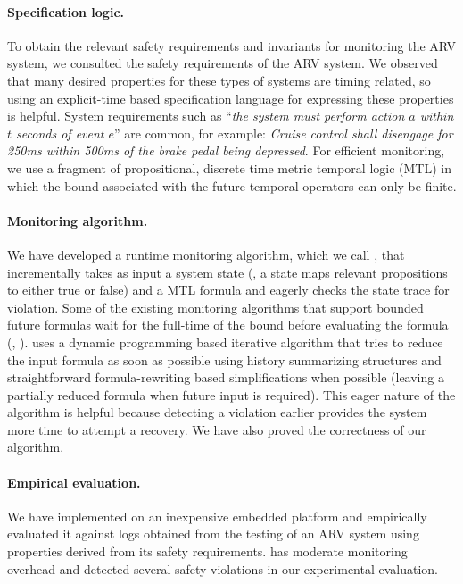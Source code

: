 \paragraph{Specification logic.}
To obtain the relevant safety requirements and invariants for monitoring the ARV system, we consulted the safety requirements of the ARV system. 
We observed that many desired properties for these types of systems are timing related, so using an explicit-time based specification language for expressing these properties is helpful. 
System requirements such as ``\emph{the system must perform action $a$ within $t$ seconds of event $e$}'' are common, 
%
for example: \emph{Cruise control shall disengage for 250ms within 500ms of the brake pedal being depressed}.
%
For efficient monitoring, we use a fragment of propositional, discrete time metric temporal logic (MTL)\cite{Koymans1990} in which the bound associated with the future temporal operators can only be finite. %

\paragraph{Monitoring algorithm.}
We have developed a runtime monitoring algorithm, which we call \monitor, that incrementally takes as input a system state (\ie, a state maps relevant propositions to either true or false) and a MTL formula and eagerly checks the state trace for violation. 
Some of the existing monitoring algorithms that support bounded future formulas wait for the full-time of the bound before evaluating the formula (\eg, \cite{Basin2008}). 
\monitor uses a dynamic programming based iterative algorithm that tries to reduce the input formula as soon as possible using history summarizing structures and straightforward formula-rewriting based simplifications when possible (leaving a partially reduced formula when future input is required).
This eager nature of the algorithm is helpful because detecting a violation earlier provides the system more time to attempt a recovery. We have also proved the correctness of our algorithm. 

\paragraph{Empirical evaluation.} 
We have implemented \monitor on an inexpensive embedded platform and empirically evaluated it against logs obtained from the testing of an ARV system using properties derived from its safety requirements.
\monitor has moderate monitoring overhead and detected several safety violations in our experimental evaluation.  


